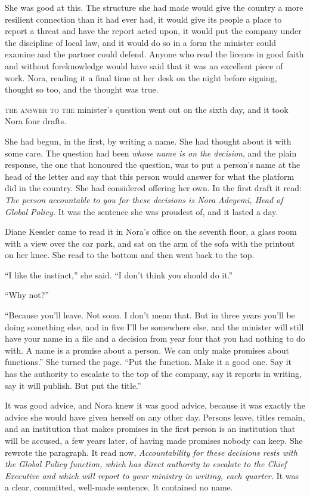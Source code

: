 She was good at this. The structure she had made would give the country a more resilient connection than it had ever had, it would give its people a place to report a threat and have the report acted upon, it would put the company under the discipline of local law, and it would do so in a form the minister could examine and the partner could defend. Anyone who read the licence in good faith and without foreknowledge would have said that it was an excellent piece of work. Nora, reading it a final time at her desk on the night before signing, thought so too, and the thought was true.


\textsc{the answer to the} minister's question went out on the sixth day, and it took Nora four drafts.

She had begun, in the first, by writing a name. She had thought about it with some care. The question had been \emph{whose name is on the decision}, and the plain response, the one that honoured the question, was to put a person's name at the head of the letter and say that this person would answer for what the platform did in the country. She had considered offering her own. In the first draft it read: \emph{The person accountable to you for these decisions is Nora Adeyemi, Head of Global Policy.} It was the sentence she was proudest of, and it lasted a day.

Diane Kessler came to read it in Nora's office on the seventh floor, a glass room with a view over the car park, and sat on the arm of the sofa with the printout on her knee. She read to the bottom and then went back to the top.

``I like the instinct,'' she said. ``I don't think you should do it.''

``Why not?''

``Because you'll leave. Not soon. I don't mean that. But in three years you'll be doing something else, and in five I'll be somewhere else, and the minister will still have your name in a file and a decision from year four that you had nothing to do with. A name is a promise about a person. We can only make promises about functions.'' She turned the page. ``Put the function. Make it a good one. Say it has the authority to escalate to the top of the company, say it reports in writing, say it will publish. But put the title.''

It was good advice, and Nora knew it was good advice, because it was exactly the advice she would have given herself on any other day. Persons leave, titles remain, and an institution that makes promises in the first person is an institution that will be accused, a few years later, of having made promises nobody can keep. She rewrote the paragraph. It read now, \emph{Accountability for these decisions rests with the Global Policy function, which has direct authority to escalate to the Chief Executive and which will report to your ministry in writing, each quarter.} It was a clear, committed, well-made sentence. It contained no name.

